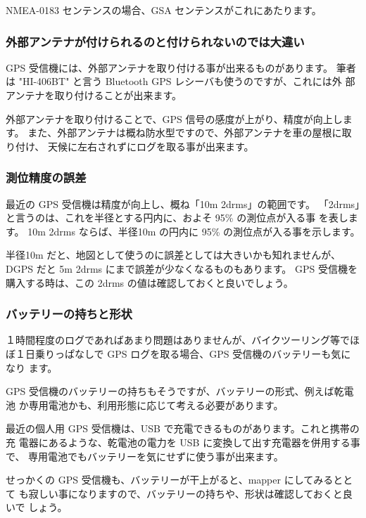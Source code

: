 \documentclass[mingoth,a4paper]{jsarticle}
\begin{document}
NMEA-0183 センテンスの場合、GSA センテンスがこれにあたります。

\subsubsection{外部アンテナが付けられるのと付けられないのでは大違い}

GPS 受信機には、外部アンテナを取り付ける事が出来るものがあります。
筆者は "HI-406BT" と言う Bluetooth GPS レシーバも使うのですが、これには外
部アンテナを取り付けることが出来ます。

外部アンテナを取り付けることで、GPS 信号の感度が上がり、精度が向上します。
また、外部アンテナは概ね防水型ですので、外部アンテナを車の屋根に取り付け、
天候に左右されずにログを取る事が出来ます。

\subsubsection{測位精度の誤差}

最近の GPS 受信機は精度が向上し、概ね「10m 2drms」の範囲です。
「2drms」と言うのは、これを半径とする円内に、およそ 95\% の測位点が入る事
を表します。
10m 2drms ならば、半径10m の円内に 95\% の測位点が入る事を示します。

半径10m だと、地図として使うのに誤差としては大きいかも知れませんが、DGPS
だと 5m 2drms にまで誤差が少なくなるものもあります。
GPS 受信機を購入する時は、この 2drms の値は確認しておくと良いでしょう。

\subsubsection{バッテリーの持ちと形状}

１時間程度のログであればあまり問題はありませんが、バイクツーリング等でほ
ぼ１日乗りっぱなしで GPS ログを取る場合、GPS 受信機のバッテリーも気になり
ます。

GPS 受信機のバッテリーの持ちもそうですが、バッテリーの形式、例えば乾電池
か専用電池かも、利用形態に応じて考える必要があります。

最近の個人用 GPS 受信機は、USB で充電できるものがあります。これと携帯の充
電器にあるような、乾電池の電力を USB に変換して出す充電器を併用する事で、
専用電池でもバッテリーを気にせずに使う事が出来ます。

せっかくの GPS 受信機も、バッテリーが干上がると、mapper にしてみるととて
も寂しい事になりますので、バッテリーの持ちや、形状は確認しておくと良いで
しょう。
\end{document}
